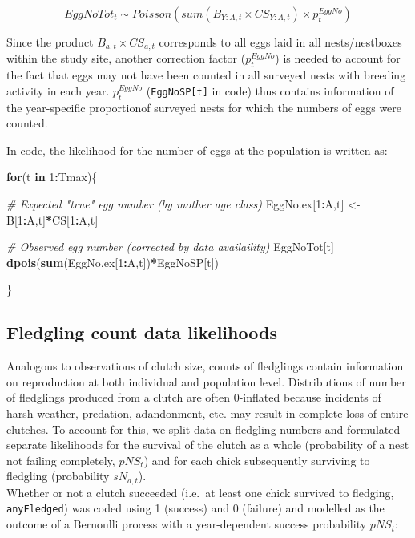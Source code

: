 \documentclass[
]{book}
\newenvironment{Shaded}{\begin{snugshade}}{\end{snugshade}}
\newcommand{\CommentTok}[1]{\textcolor[rgb]{0.56,0.35,0.01}{\textit{#1}}}
\newcommand{\ControlFlowTok}[1]{\textcolor[rgb]{0.13,0.29,0.53}{\textbf{#1}}}
\newcommand{\DecValTok}[1]{\textcolor[rgb]{0.00,0.00,0.81}{#1}}
\newcommand{\KeywordTok}[1]{\textcolor[rgb]{0.13,0.29,0.53}{\textbf{#1}}}
\newcommand{\NormalTok}[1]{#1}
\newcommand{\OperatorTok}[1]{\textcolor[rgb]{0.81,0.36,0.00}{\textbf{#1}}}
\newcommand{\StringTok}[1]{\textcolor[rgb]{0.31,0.60,0.02}{#1}}
\begin{document}
\begin{equation}
EggNoTot_t \sim Poisson(sum(B_{Y:A,t} \times CS_{Y:A,t}) \times p_t^{EggNo})
\end{equation}

Since the product \(B_{a,t} \times CS_{a,t}\) corresponds to all eggs laid in all nests/nestboxes within the study site, another correction factor (\(p_t^{EggNo}\)) is needed to account for the fact that eggs may not have been counted in all surveyed nests with breeding activity in each year. \(p_t^{EggNo}\) (\texttt{EggNoSP{[}t{]}} in code) thus contains information of the year-specific proportionof surveyed nests for which the numbers of eggs were counted.

In code, the likelihood for the number of eggs at the population is written as:

\begin{Shaded}
\begin{Highlighting}[]
\ControlFlowTok{for}\NormalTok{(t }\ControlFlowTok{in} \DecValTok{1}\OperatorTok{:}\NormalTok{Tmax)\{}

    \CommentTok{# Expected "true" egg number (by mother age class)}
\NormalTok{    EggNo.ex[}\DecValTok{1}\OperatorTok{:}\NormalTok{A,t] <-}\StringTok{ }\NormalTok{B[}\DecValTok{1}\OperatorTok{:}\NormalTok{A,t]}\OperatorTok{*}\NormalTok{CS[}\DecValTok{1}\OperatorTok{:}\NormalTok{A,t]}

    \CommentTok{# Observed egg number (corrected by data availaility)}
\NormalTok{    EggNoTot[t] }\OperatorTok{~}\StringTok{ }\KeywordTok{dpois}\NormalTok{(}\KeywordTok{sum}\NormalTok{(EggNo.ex[}\DecValTok{1}\OperatorTok{:}\NormalTok{A,t])}\OperatorTok{*}\NormalTok{EggNoSP[t])}

\NormalTok{\}}
\end{Highlighting}
\end{Shaded}

\hypertarget{fledgling-count-data-likelihoods}{%
\subsection{Fledgling count data likelihoods}\label{fledgling-count-data-likelihoods}}

Analogous to observations of clutch size, counts of fledglings contain
information on reproduction at both individual and population level.
Distributions of number of fledglings produced from a clutch are often 0-inflated
because incidents of harsh weather, predation, adandonment, etc. may result in
complete loss of entire clutches. To account for this, we split data on fledgling
numbers and formulated separate likelihoods for the survival of the clutch as
a whole (probability of a nest not failing completely, \(pNS_t\)) and for each
chick subsequently surviving to fledgling (probability \(sN_{a,t}\)).\\
Whether or not a clutch succeeded (i.e.~at least one chick survived to fledging,
\texttt{anyFledged}) was coded using 1 (success) and 0 (failure) and modelled as the
outcome of a Bernoulli process with a year-dependent success probability \(pNS_t\):
\end{document}
